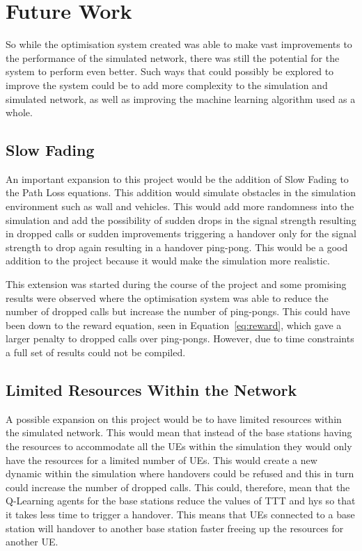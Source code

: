 \chapter{Future Work}\label{future work}
So while the optimisation system created was able to make vast improvements to the performance of the simulated network, there was still the potential for the system to perform even better. Such ways that could possibly be explored to improve the system could be to add more complexity to the simulation and simulated network, as well as improving the machine learning algorithm used as a whole.

\section{Slow Fading}
An important expansion to this project would be the addition of Slow Fading to the Path Loss equations. This addition would simulate obstacles in the simulation environment such as wall and vehicles. This would add more randomness into the simulation and add the possibility of sudden drops in the signal strength resulting in dropped calls or sudden improvements triggering a handover only for the signal strength to drop again resulting in a handover ping-pong. This would be a good addition to the project because it would make the simulation more realistic. 

This extension was started during the course of the project and some promising results were observed where the optimisation system was able to reduce the number of dropped calls but increase the number of ping-pongs. This could have been down to the reward equation, seen in Equation~\ref{eq:reward}, which gave a larger penalty to dropped calls over ping-pongs. However, due to time constraints a full set of results could not be compiled.

\section{Limited Resources Within the Network}
A possible expansion on this project would be to have limited resources within the simulated network. This would mean that instead of the base stations having the resources to accommodate all the UEs within the simulation they would only have the resources for a limited number of UEs. This would create a new dynamic within the simulation where handovers could be refused and this in turn could increase the number of dropped calls. This could, therefore, mean that the Q-Learning agents for the base stations reduce the values of TTT and hys so that it takes less time to trigger a handover. This means that UEs connected to a base station will handover to another base station faster freeing up the resources for another UE. 

